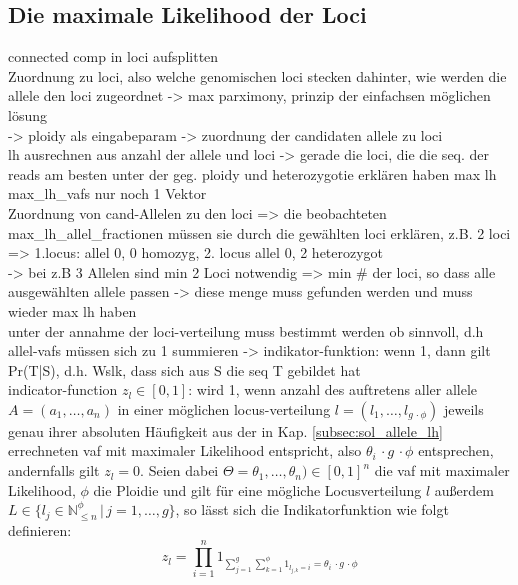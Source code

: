 \subsection{Die maximale Likelihood der Loci} \label{subsec:sol_loci_lh}
connected comp in loci aufsplitten\\
Zuordnung zu loci, also welche genomischen loci stecken dahinter, wie werden die allele den loci zugeordnet -> max parximony, prinzip der einfachsen möglichen lösung \\
-> ploidy als eingabeparam -> zuordnung der candidaten allele zu loci\\
lh ausrechnen aus anzahl der allele und loci -> gerade die loci, die die seq. der reads am besten unter der geg. ploidy und heterozygotie erklären haben max lh
max\_lh\_vafs nur noch 1 Vektor\\
Zuordnung von cand-Allelen zu den loci => die beobachteten max\_lh\_allel\_fractionen müssen sie durch die gewählten loci erklären, z.B. 2 loci => 1.locus: allel 0, 0 homozyg, 2. locus allel 0, 2 heterozygot\\
-> bei z.B 3 Allelen sind min 2 Loci notwendig => min \# der loci, so dass alle ausgewählten allele passen -> diese menge muss gefunden werden und muss wieder max lh haben\\
unter der annahme der loci-verteilung muss bestimmt werden ob sinnvoll, d.h allel-vafs müssen sich zu 1 summieren -> indikator-funktion: wenn 1, dann gilt Pr(T|S), d.h. Wslk, dass sich aus S die seq T gebildet hat\\

indicator-function $z_{l} \in {[0,1]}$: wird 1, wenn anzahl des auftretens aller allele $A = (a_{1}, \dots, a_{n})$ in einer möglichen locus-verteilung $l = (l_{1}, \dots, l_{g \, \cdotp \phi})$ jeweils genau ihrer absoluten Häufigkeit aus der in Kap. \ref{subsec:sol_allele_lh} errechneten vaf mit maximaler Likelihood entspricht, also $\theta_{i} \, \cdotp g \, \cdotp \phi$ entsprechen, andernfalls gilt $ z_{l} = 0 $. Seien dabei  $\Theta=\theta_{1},\dots,\theta_{n}) \in [0,1]^n $ die vaf mit maximaler Likelihood, $ \phi $ die Ploidie und gilt für eine mögliche Locusverteilung $l$ außerdem $L \in \{l_{j} \in \mathds{N}_{\leq n}^\phi \, | \, j=1, \dots, g\}$, so lässt sich die Indikatorfunktion wie folgt definieren:
\begin{equation} \label{eqn:2-xxx4}
\tag{2-xxx4}
z_{l}=\prod_{i=1}^{n}1_{\sum_{j=1}^{g}\sum_{k=1}^{\phi}1_{l_{j,k}=i} = \theta_{i} \, \cdotp g \, \cdotp \phi}
\end{equation}

